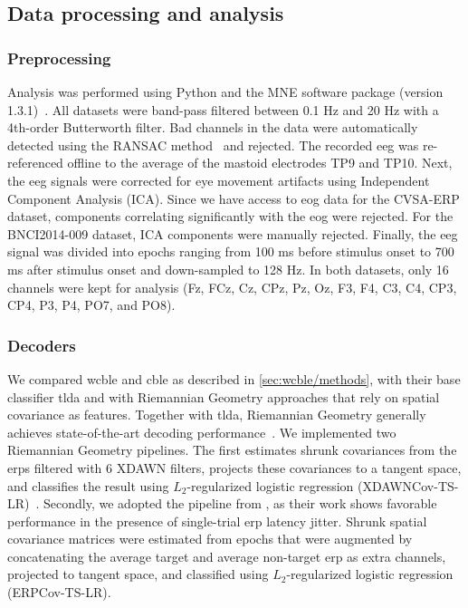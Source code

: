 \subsection{Data processing and analysis}
\subsubsection{Preprocessing}
Analysis was performed using Python and the MNE software package (version
1.3.1)~\cite{Gramfort2013}.
All datasets were band-pass filtered between 0.1 Hz and 20 Hz with a 4th-order Butterworth filter.
Bad channels in the data were automatically detected using the RANSAC
method~\cite{Fischler1981} and rejected.
The recorded \ac{eeg} was re-referenced
offline to the average of the mastoid electrodes TP9 and TP10.
Next, the \ac{eeg} signals were corrected for eye movement artifacts using
Independent Component Analysis (ICA).
Since we have access to \ac{eog} data for the CVSA-ERP dataset, components correlating
significantly with the \ac{eog} were rejected.
For the BNCI2014-009 dataset, ICA components were manually rejected.
Finally, the \ac{eeg} signal was divided into epochs ranging from 100 ms before stimulus onset to 700 ms after stimulus onset and down-sampled to 128 Hz.
In both datasets, only 16 channels were kept for
analysis (Fz, FCz, Cz, CPz, Pz, Oz, F3, F4, C3, C4, CP3, CP4, P3, P4, PO7, and
PO8).

\subsubsection{Decoders}%
\label{sec:covert-align/methods/decoders}
We compared \ac{wcble} and \ac{cble} as described in
\cref{sec:wcble/methods}, with their base classifier \ac{tlda} and with
Riemannian Geometry approaches that rely on spatial covariance as features.
Together with \ac{tlda}, Riemannian Geometry generally achieves state-of-the-art decoding
performance~\cite{Lotte2018}.
We implemented two Riemannian Geometry pipelines.
The first estimates shrunk covariances from the \acp{erp} filtered with 6 XDAWN
filters, projects these covariances to a tangent space, and classifies the
result using $L_2$-regularized logistic regression
(XDAWNCov-TS-LR)~\cite{Cecotti2017}.
Secondly, we adopted the pipeline from \textcite{Aydarkhanov2020}, as their work shows
favorable performance in the presence of single-trial \ac{erp} latency jitter.
Shrunk spatial covariance matrices were estimated from epochs that were
augmented by concatenating the average target and average non-target \ac{erp} as
extra channels, projected to tangent space, and classified using
$L_2$-regularized logistic regression (ERPCov-TS-LR).

